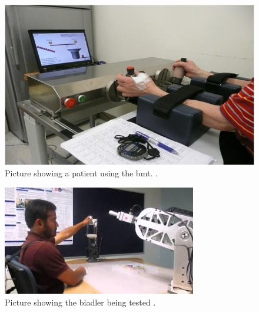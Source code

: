 \begin{figure}[p]%
	\centering
	
	\includegraphics[width=\linewidth]{figures/ch2/bimanu}
	\caption{Picture showing a patient using the \ac{bmt}. \cite{bimanuimage}.}
	\label{fig:bmt}
\end{figure}

\begin{figure}[p]%
	\centering
	\includegraphics[width=\linewidth]{figures/ch2/biadler}
	\caption{Picture showing the \ac{biadler} being tested \cite{johnsonlab}.}
	\label{fig:biadler}
\end{figure}

